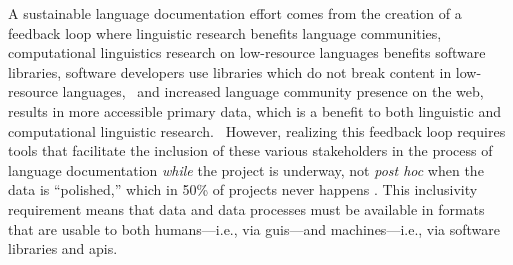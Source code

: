 \documentclass[11pt]{article}
\newcommand{\smalltodo}[2][]
    {\todo[caption={#2}, #1]
    {\tiny#2\normalsize}}
\begin{document}
A sustainable language documentation effort comes from the creation of a
feedback loop where linguistic research benefits language communities,
computational linguistics research on low-resource languages benefits software
libraries, software developers use libraries which do not break content in
low-resource languages,
~and increased language community presence on the web,  results in more
accessible primary data, which is a benefit to both linguistic and computational
linguistic research.%
~However, realizing this feedback loop requires tools that facilitate
the inclusion of these various stakeholders in the process of language documentation
\emph{while} the project is underway, not \emph{post hoc} when the data is ``polished,''
which in 50\% of projects never happens \cite{Thieberger:2012}. This
inclusivity requirement means that data and data processes must be available in
formats that are usable to both humans---i.e., via \glspl{gui}---and machines---i.e.,
via software libraries and \glspl{api}.
\end{document}
